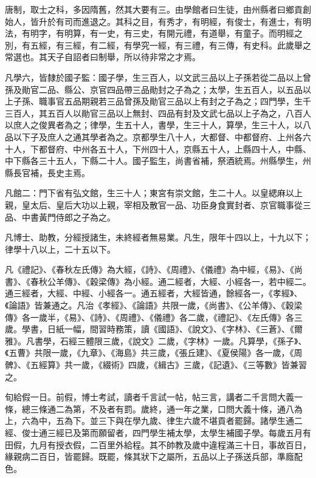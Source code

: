 
\begin{pinyinscope}

 唐制，取士之科，多因隋舊，然其大要有三。由學館者曰生徒，由州縣者曰鄉貢創始人，皆升於有司而進退之。其科之目，有秀才，有明經，有俊士，有進士，有明法，有明字，有明算，有一史，有三史，有開元禮，有道舉，有童子。而明經之別，有五經，有三經，有二經，有學究一經，有三禮，有三傳，有史科。此歲舉之常選也。其天子自詔者曰制舉，所以待非常之才焉。



 凡學六，皆隸於國子監：國子學，生三百人，以文武三品以上子孫若從二品以上曾孫及勛官二品、縣公、京官四品帶三品勛封之子為之；太學，生五百人，以五品以上子孫、職事官五品期親若三品曾孫及勛官三品以上有封之子為之；四門學，生千三百人，其五百人以勛官三品以上無封、四品有封及文武七品以上子為之，八百人以庶人之俊異者為之；律學，生五十人，書學，生三十人，算學，生三十人，以八品以下子及庶人之通其學者為之。京都學生八十人，大都督、中都督府、上州各六十人，下都督府、中州各五十人，下州四十人，京縣五十人，上縣四十人，中縣、中下縣各三十五人，下縣二十人。國子監生，尚書省補，祭酒統焉。州縣學生，州縣長官補，長史主焉。



 凡館二：門下省有弘文館，生三十人；東宮有崇文館，生二十人。以皇緦麻以上親，皇太后、皇后大功以上親，宰相及散官一品、功臣身食實封者、京官職事從三品、中書黃門侍郎之子為之。



 凡博士、助教，分經授諸生，未終經者無易業。凡生，限年十四以上，十九以下；律學十八以上，二十五以下。



 凡《禮記》、《春秋左氏傳》為大經，《詩》、《周禮》、《儀禮》為中經，《易》、《尚書》、《春秋公羊傳》、《穀梁傳》為小經。通二經者，大經、小經各一，若中經二。通三經者，大經、中經、小經各一。通五經者，大經皆通，餘經各一，《孝經》、《論語》皆兼通之。凡治《孝經》、《論語》共限一歲，《尚書》、《公羊傳》、《穀梁傳》各一歲半，《易》、《詩》、《周禮》、《儀禮》各二歲，《禮記》、《左氏傳》各三歲。學書，日紙一幅，間習時務策，讀《國語》、《說文》、《字林》、《三蒼》、《爾雅》。凡書學，石經三體限三歲，《說文》二歲，《字林》一歲。凡算學，《孫子》、《五曹》共限一歲，《九章》、《海島》共三歲，《張丘建》、《夏侯陽》各一歲，《周髀》、《五經算》共一歲，《綴術》四歲，《緝古》三歲，《記遺》、《三等數》皆兼習之。



 旬給假一日。前假，博士考試，讀者千言試一帖，帖三言，講者二千言問大義一條，總三條通二為第，不及者有罰。歲終，通一年之業，口問大義十條，通八為上，六為中，五為下。並三下與在學九歲、律生六歲不堪貢者罷歸。諸學生通二經、俊士通三經已及第而願留者，四門學生補太學，太學生補國子學。每歲五月有田假，九月有授衣假，二百里外給程。其不帥教及歲中違程滿三十日，事故百日，緣親病二百日，皆罷歸。既罷，條其狀下之屬所，五品以上子孫送兵部，準廕配色。




\end{pinyinscope}
